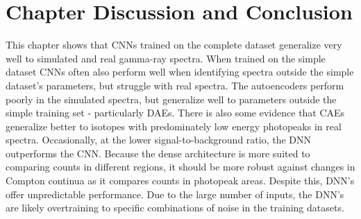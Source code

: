 \section{Chapter Discussion and Conclusion}

This chapter shows that CNNs trained on the complete dataset generalize very well to simulated and real gamma-ray spectra. When trained on the simple dataset CNNs often also perform well when identifying spectra outside the simple dataset's parameters, but struggle with real spectra. The autoencoders perform poorly in the simulated spectra, but generalize well to parameters outside the simple training set - particularly DAEs. There is also some evidence that CAEs generalize better to isotopes with predominately low energy photopeaks in real spectra. Occasionally, at the lower signal-to-background ratio, the DNN outperforms the CNN. Because the dense architecture is more suited to comparing counts in different regions, it should be more robust against changes in Compton continua as it compares counts in photopeak areas. Despite this, DNN's offer unpredictable performance. Due to the large number of inputs, the DNN's are likely overtraining to specific combinations of noise in the training datasets.




